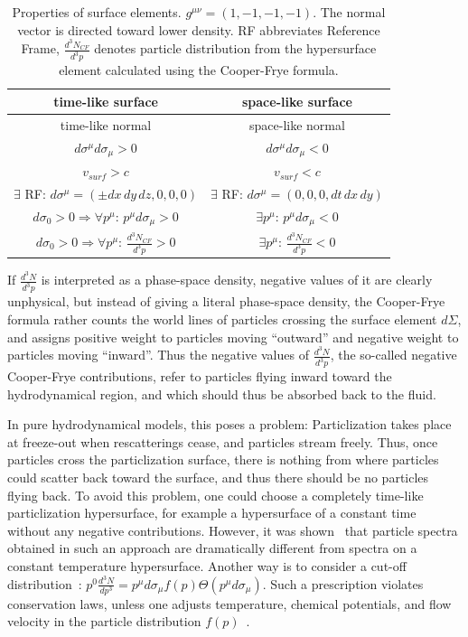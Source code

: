 \begin{table}[ht]
 \begin{tabular}{cc}
   \hline \hline
   time-like surface & space-like surface  \\
   \hline
   time-like normal & space-like normal \\
   $d\sigma^{\mu}d\sigma_{\mu}>0$ & $d\sigma^{\mu}d\sigma_{\mu}<0$ \\
   $v_{surf} > c$  &  $v_{surf} < c$ \\
   $\exists$ RF: $d\sigma^{\mu} = (\pm dx\,dy\,dz, 0, 0, 0)$ &
   $\exists$ RF: $d\sigma^{\mu} = (0, 0, 0, dt\,dx\,dy)$ \\
   $d\sigma_0 > 0 \Rightarrow \forall p^{\mu}$: $p^{\mu}d\sigma_{\mu} > 0$ &
   $\exists p^{\mu}$: $p^{\mu}d\sigma_{\mu} < 0$ \\
   $d\sigma_0 > 0 \Rightarrow \forall p^{\mu}$: $\frac{d^3N_{CF}}{d^3p} > 0$ &
   $\exists p^{\mu}$: $\frac{d^3N_{CF}}{d^3p} < 0$ \\
   \hline \hline
 \end{tabular}
 \caption{Properties of surface elements. $g^{\mu \nu} =
   (1,-1,-1,-1)$. The normal vector is directed toward lower
   density. RF abbreviates Reference Frame, $\frac{d^3N_{CF}}{d^3p}$
   denotes particle distribution from the hypersurface element calculated
   using the Cooper-Frye formula. }
 \label{Tab:surf_prop}
\end{table}

If $\frac{d^3N}{d^3p}$ is interpreted as a phase-space density,
negative values of it are clearly unphysical, but instead of giving a
literal phase-space density, the Cooper-Frye formula rather counts the
world lines of particles crossing the surface element $d\Sigma$, and
assigns positive weight to particles moving ``outward'' and negative
weight to particles moving ``inward''. Thus the negative values of
$\frac{d^3N}{d^3p}$, the so-called negative Cooper-Frye contributions,
refer to particles flying inward toward the hydrodynamical region, and
which should thus be absorbed back to the fluid.

In pure hydrodynamical models, this poses a problem: Particlization
takes place at freeze-out when rescatterings cease, and particles
stream freely. Thus, once particles cross the particlization surface,
there is nothing from where particles could scatter back toward the
surface, and thus there should be no particles flying back. To avoid
this problem, one could choose a completely time-like particlization
hypersurface, for example a hypersurface of a constant time without
any negative contributions. However, it was shown~\cite{Rischke:1998fq}
that particle spectra obtained in such an approach are dramatically
different from spectra on a constant temperature hypersurface. Another
way is to consider a cut-off distribution~\cite{Bugaev:1996zq}:
$p^0 \frac{d^3N}{dp^3} =
 p^{\mu} d\sigma_{\mu} f(p) \Theta (p^{\mu} d\sigma_{\mu})$. Such a
prescription violates conservation laws, unless one adjusts
temperature, chemical potentials, and flow velocity in the particle
distribution $f(p)$~\cite{Anderlik:1998cb,Anderlik:1998et}.


